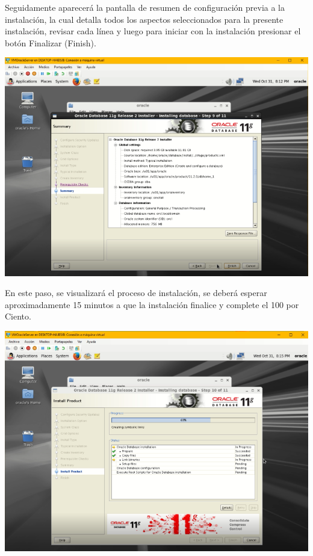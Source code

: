 \vspace{\baselineskip}

Seguidamente aparecerá la pantalla de resumen de configuración previa a la instalación, la cual detalla todos los aspectos seleccionados para la presente instalación, revisar cada línea y luego para iniciar con la instalación presionar el botón Finalizar (Finish).
\begin{center}
	\includegraphics[width=16cm]{./Imagenes/81} 
\end{center}

\vspace{\baselineskip}

En este paso, se visualizará el proceso de instalación, se deberá esperar aproximadamente 15 minutos a que la instalación finalice y complete el 100 por Ciento.
\begin{center}
	\includegraphics[width=14cm]{./Imagenes/82} 
\end{center}

